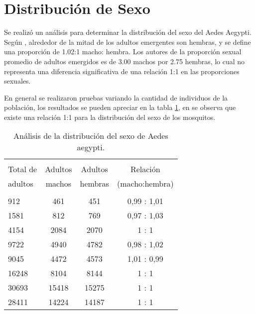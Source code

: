 \section{Distribución de Sexo}
Se realizó un análisis para determinar la distribución del sexo del Aedes Aegypti. Según
\cite{otero2006stochastic}, alrededor de la mitad de los adultos emergentes son hembras,
y se define una proporción de 1.02:1 macho: hembra. Los autores de \cite{manrique1998desarrollo}
la proporción sexual promedio de adultos emergidos es de 3.00 machos por 2.75 hembras, lo cual
no representa una diferencia significativa de una relación 1:1 en las proporciones sexuales.

En general se realizaron pruebas variando la cantidad de individuos de la población, los resultados se
pueden apreciar en la tabla \ref{tab:distribucion-sexo-test}, en se observa que existe una relación 1:1
para la distribución del sexo de los mosquitos.

\begin{table}
    \begin{center}
        \caption{ \label{tab:distribucion-sexo-test} Análisis de la distribución del sexo de Aedes
        aegypti.}
        \begin{tabular}{p{3cm} c c c }
            \hline \\
            Total de & Adultos & Adultos & Relación \\
            adultos  & machos  & hembras & (macho:hembra) \\
            \hline
            \hline \\
            912    &  461    &  451    &  0,99 : 1,01 \\
            1581   &  812    &  769    &  0,97 : 1,03 \\
            4154   &  2084   &  2070   &  1    : 1 \\
            9722   &  4940   &  4782   &  0,98 : 1,02 \\
            9045   &  4472   &  4573   &  1,01 : 0,99 \\
            16248  &  8104   &  8144   &  1    : 1 \\
            30693  &  15418  &  15275  &  1    : 1 \\
            28411  &  14224  &  14187  &  1    : 1 \\
        \end{tabular}

    \end{center}
\end{table}
